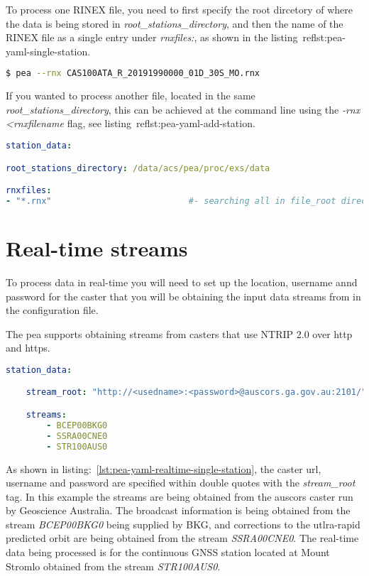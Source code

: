 %
To process one RINEX file, you need to first specify the root dircetory of where the data is being stored in \emph{root\_stations\_directory}, and then the name of the RINEX file as a single entry under \emph{rnxfiles:}, as shown in the listing~ref{lst:pea-yaml-single-station}. 
%
\begin{lstlisting}[language=bash,caption=Example showing how to add a RINEX file to the processing list form the command line]
$ pea --rnx CAS100ATA_R_20191990000_01D_30S_MO.rnx
\end{lstlisting}
%
If you wanted to process another file, located in the same \emph{root\_stations\_directory}, this can be achieved at the command line using the \emph{-rnx <rnxfilename} flag, see listing~ref{lst:pea-yaml-add-station}.
%
\begin{lstlisting}[language=yaml,caption=yaml input files configuration example]
station_data:

root_stations_directory: /data/acs/pea/proc/exs/data

rnxfiles:
- "*.rnx"                           #- searching all in file_root directory
\end{lstlisting}

\section{Real-time streams}
To process data in real-time you will need to set up the location, username annd password for the caster that you will be obtaining the input data streams from in the configuration file.

The pea supports obtaining streams from casters that use NTRIP 2.0 over http and https.


\begin{lstlisting}[language=yaml,caption=yaml input files configuration example]
station_data:

	stream_root: "http://<usedname>:<password>@auscors.ga.gov.au:2101/"

	streams:
		- BCEP00BKG0
		- SSRA00CNE0
		- STR100AUS0
\end{lstlisting}
%
As shown in listing:~\ref{lst:pea-yaml-realtime-single-station}, the caster url, username and password are specified within double quotes with the \emph{stream\_root} tag. In this example the streams are being obtained from the auscors caster run by Geoscience Australia. 
The broadcast information is being obtained from the stream \emph{BCEP00BKG0} being supplied by BKG, and corrections to the utlra-rapid predicted orbit are being obtained from the stream \emph{SSRA00CNE0}. 
The real-time data being processed is for the continuous GNSS station located at Mount Stromlo obtained from the stream \emph{STR100AUS0}.

